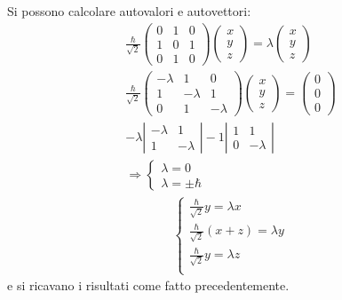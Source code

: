 Si possono calcolare autovalori e autovettori:
\begin{equation}\begin{split}
\frac{\hbar }{\sqrt{2}}\left(\begin{matrix}0&1&0\\1&0&1\\0&1&0\end{matrix}\right)\left(\begin{matrix}x\\y\\z\end{matrix}\right)=\lambda\left(\begin{matrix}x\\y\\z\end{matrix}\right)\\
\frac{\hbar }{\sqrt{2}}\left(\begin{matrix}-\lambda&1&0\\1&-\lambda&1\\0&1&-\lambda\end{matrix}\right)\left(\begin{matrix}x\\y\\z\end{matrix}\right)=\left(\begin{matrix}0\\0\\0\end{matrix}\right)\\
-\lambda\left|\begin{matrix}-\lambda&1\\1&-\lambda\end{matrix}\right|-1\left|\begin{matrix}1&1\\0&-\lambda\end{matrix}\right|\\
\Longrightarrow \begin{cases}
\lambda=0\\
\lambda=\pm\hbar 
\end{cases}
\end{split}\end{equation}
\begin{equation}\begin{split}
\begin{cases}
\frac{\hbar }{\sqrt{2}}y=\lambda x\\
\frac{\hbar }{\sqrt{2}}\left(x+z\right)=\lambda y\\
\frac{\hbar }{\sqrt{2}}y=\lambda z\\
\end{cases}
\end{split}\end{equation}
e si ricavano i risultati come fatto precedentemente.

